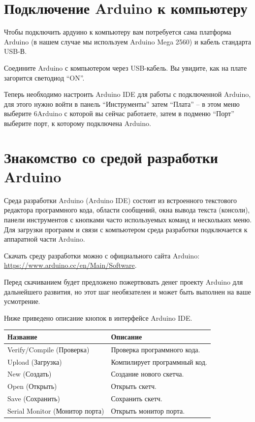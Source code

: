 \documentclass[a4paper,twoside]{book}
\begin{document}
\section{Подключение Arduino к компьютеру}
Чтобы подключить ардуино к компьютеру вам потребуется сама платформа Arduino (в
нашем случае мы используем Arduino Mega 2560) и кабель стандарта USB-В.

Соедините Arduino с компьютером через USB-кабель. Вы увидите, как на плате
загорится светодиод ``ON''.

Теперь необходимо настроить Arduino IDE для работы с подключенной Arduino, для
этого нужно войти в панель ``Инструменты'' затем ``Плата'' -- в этом меню
выберите 6Arduino с которой вы сейчас работаете, затем в подменю ``Порт''
выберите порт, к которому подключена Arduino.

\section{Знакомство со средой разработки Arduino}
Среда разработки Arduino (Arduino IDE) состоит из встроенного текстового
редактора программного кода, области сообщений, окна вывода текста (консоли),
панели инструментов с кнопками часто используемых команд и нескольких меню. Для
загрузки программ и связи с компьютером среда разработки подключается к
аппаратной части Arduino.

Скачать среду разработки можно с официального сайта Arduino:
\url{https://www.arduino.cc/en/Main/Software}.

Перед скачиванием будет предложено пожертвовать денег проекту Arduino для
дальнейшего развития, но этот шаг необязателен и может быть выполнен на ваше
усмотрение.

Ниже приведено описание кнопок в интерфейсе Arduino IDE.

\begin{tabular}{p{4cm}|p{6cm}}
  Название & Описание \\
  \hline \hline
  Verify/Compile (Проверка) & Проверка программного кода. \\
  \hline
  Upload (Загрузка) & Компилирует программный код.\\
  \hline
  New (Создать) & Создание нового скетча.\\
  \hline
  Open (Открыть) & Открыть скетч.\\
  \hline
  Save (Сохранить) & Сохранить скетч.\\
  \hline
  Serial Monitor (Монитор порта) & Открыть монитор порта.\\
\end{tabular}
\end{document}
